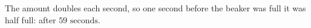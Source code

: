 The amount doubles each second, so one second before the beaker was full it was half full: after $\boxed{59\text{ seconds}}$.

